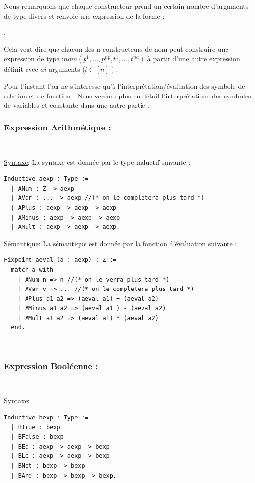 \documentclass{article}
\begin{document}
\noindent Nous remarquons que chaque constructeur prend un certain nombre d'arguments de type divers et renvoie une expression de la forme :
\begin{center}
.
\end{center}
\noindent Cela veut dire que chacun des n constructeurs de nom peut  construire une expression de type  :$nom(p^1,...,p^{np},t^1,...,t^{na})$ à partir d'une autre expression définit avec $ai$ arguments ($i \in [n]$ ) .

Pour l'instant l'on ne s'interesse qu'à l'interprétation/évaluation des symbole de relation et de fonction . Nous verrons plus en détail l'interprétations des symboles de variables et constante dans une autre partie .

\subsubsection{Expression Arithmétique  :}
\,

\noindent \underline{Syntaxe}:
La syntaxe est donnée par le type inductif suivante :
\begin{lstlisting}[style=CStyle]
  Inductive aexp : Type :=
  | ANum : Z -> aexp
  | AVar : ... -> aexp //(* on le completera plus tard *)
  | APlus : aexp -> aexp -> aexp
  | AMinus : aexp -> aexp -> aexp
  | AMult : aexp -> aexp -> aexp.
\end{lstlisting}


\noindent \underline{Sémantique}:
La sémantique est donnée par la fonction d'évaluation suivante :
\begin{lstlisting}[style=CStyle]
Fixpoint aeval (a : aexp) : Z :=
  match a with
    | ANum n => n //(* on le verra plus tard *) 
    | AVar v => ... //(* on le completera plus tard *)
    | APlus a1 a2 => (aeval a1) + (aeval a2)
    | AMinus a1 a2 => (aeval a1 ) - (aeval a2)
    | AMult a1 a2 => (aeval a1) * (aeval a2)
  end.
  \end{lstlisting}
\,

\subsubsection{Expression Booléenne :}
\,

\noindent \underline{Syntaxe}:
\begin{lstlisting}[style=CStyle]
Inductive bexp : Type :=
  | BTrue : bexp
  | BFalse : bexp
  | BEq : aexp -> aexp -> bexp
  | BLe : aexp -> aexp -> bexp
  | BNot : bexp -> bexp
  | BAnd : bexp -> bexp -> bexp.
\end{lstlisting}
\end{document}

